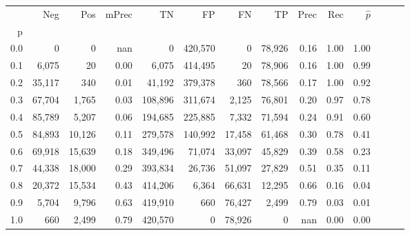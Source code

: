 \begin{tabular}{rrrrrrrrrrrrrr}
\toprule
{} &     Neg &     Pos & mPrec &       TN &       FP &      FN &      TP &  Prec &   Rec & $\hat{p}$ \\
p   &         &         &       &          &          &         &         &       &       &           \\
\midrule
0.0 &       0 &       0 &   nan &        0 &  420,570 &       0 &  78,926 &  0.16 &  1.00 &      1.00 \\
0.1 &   6,075 &      20 &  0.00 &    6,075 &  414,495 &      20 &  78,906 &  0.16 &  1.00 &      0.99 \\
0.2 &  35,117 &     340 &  0.01 &   41,192 &  379,378 &     360 &  78,566 &  0.17 &  1.00 &      0.92 \\
0.3 &  67,704 &   1,765 &  0.03 &  108,896 &  311,674 &   2,125 &  76,801 &  0.20 &  0.97 &      0.78 \\
0.4 &  85,789 &   5,207 &  0.06 &  194,685 &  225,885 &   7,332 &  71,594 &  0.24 &  0.91 &      0.60 \\
0.5 &  84,893 &  10,126 &  0.11 &  279,578 &  140,992 &  17,458 &  61,468 &  0.30 &  0.78 &      0.41 \\
0.6 &  69,918 &  15,639 &  0.18 &  349,496 &   71,074 &  33,097 &  45,829 &  0.39 &  0.58 &      0.23 \\
0.7 &  44,338 &  18,000 &  0.29 &  393,834 &   26,736 &  51,097 &  27,829 &  0.51 &  0.35 &      0.11 \\
0.8 &  20,372 &  15,534 &  0.43 &  414,206 &    6,364 &  66,631 &  12,295 &  0.66 &  0.16 &      0.04 \\
0.9 &   5,704 &   9,796 &  0.63 &  419,910 &      660 &  76,427 &   2,499 &  0.79 &  0.03 &      0.01 \\
1.0 &     660 &   2,499 &  0.79 &  420,570 &        0 &  78,926 &       0 &   nan &  0.00 &      0.00 \\
\bottomrule
\end{tabular}
